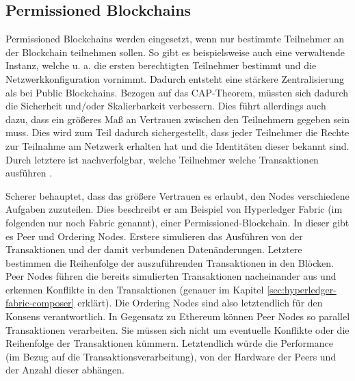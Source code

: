 \subsection{Permissioned Blockchains}
Permissioned Blockchains werden eingesetzt, wenn nur bestimmte Teilnehmer an der Blockchain teilnehmen sollen. So gibt es beispielsweise auch eine verwaltende Instanz, welche u. a. die ersten berechtigten Teilnehmer bestimmt und die Netzwerkkonfiguration vornimmt. Dadurch entsteht eine stärkere Zentralisierung als bei Public Blockchains. Bezogen auf das CAP-Theorem, müssten sich dadurch die Sicherheit und/oder Skalierbarkeit verbessern. Dies führt allerdings auch dazu, dass ein größeres Maß an Vertrauen zwischen den Teilnehmern gegeben sein muss. Dies wird zum Teil dadurch sichergestellt, dass jeder Teilnehmer die Rechte zur Teilnahme am Netzwerk erhalten hat und die Identitäten dieser bekannt sind. Durch letztere ist nachverfolgbar, welche Teilnehmer welche Transaktionen ausführen \cite{SchererPerformanceScalabilityBlockchain2017}.

Scherer behauptet, dass das größere Vertrauen es erlaubt, den Nodes verschiedene Aufgaben zuzuteilen. Dies beschreibt er am Beispiel von Hyperledger Fabric (im folgenden nur noch Fabric genannt), einer Permissioned-Blockchain. In dieser gibt es Peer und Ordering Nodes. Erstere simulieren das Ausführen von der Transaktionen und der damit verbundenen Datenänderungen. Letztere bestimmen die Reihenfolge der auszuführenden Transaktionen in den Blöcken. Peer Nodes führen die bereits simulierten Transaktionen nacheinander aus und erkennen Konflikte in den Transaktionen (genauer im Kapitel \ref{sec:hyperledger-fabric-composer} erklärt). Die Ordering Nodes sind also letztendlich für den Konsens verantwortlich. In Gegensatz zu Ethereum können Peer Nodes so parallel Transaktionen verarbeiten. Sie müssen sich nicht um eventuelle Konflikte oder die Reihenfolge der Transaktionen kümmern. Letztendlich würde die Performance (im Bezug auf die Transaktionsverarbeitung), von der Hardware der Peers und der Anzahl dieser abhängen.

